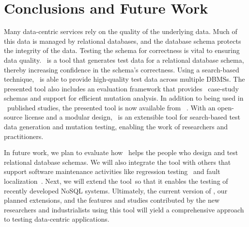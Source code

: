\section{Conclusions and Future Work}\label{sec:conclusion}


Many data-centric services rely on the quality of the underlying data. Much of this data is managed by relational
databases, and the database schema protects the integrity of the data.  Testing the schema for correctness is vital to
ensuring data quality. \sa~is a tool that generates test data for a relational database schema, thereby increasing
confidence in the schema's correctness. Using a search-based technique, \sa~is able to provide high-quality test data
across multiple DBMSs. The presented tool also includes an evaluation framework that provides
\numprovidedschemas~case-study schemas and support for efficient mutation analysis. In addition to being used in
\numuniquepapers~published studies, the presented tool is now available from \sawebsite~\cite{tool}. With an open-source
license and a modular design, \sa~is an extensible tool for search-based test data generation and mutation testing,
enabling the work of researchers and practitioners.


In future work, we plan to evaluate how \sa~helps the people who design and test relational database schemas. We will
also integrate the tool with others that support software maintenance activities like regression
testing~\cite{Kapfhammer2008} and fault localization~\cite{Clark2011}. Next, we will extend the tool~so that it enables
the testing of recently developed NoSQL systems. Ultimately, the current version of \sa, our planned extensions, and the
features and studies contributed by the new researchers and industrialists using this tool will yield a comprehensive
approach to testing data-centric applications.
